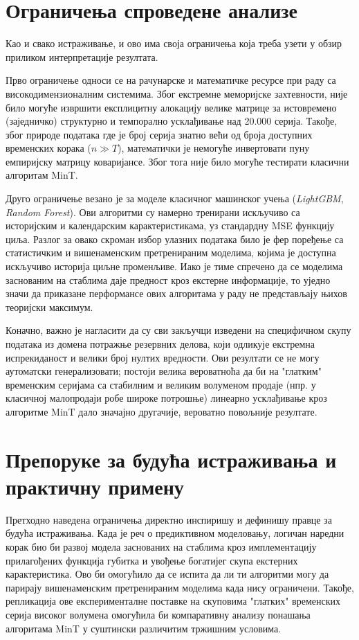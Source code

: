 \documentclass[12pt,oneside]{memoir}
\begin{document}
\section{Ограничења спроведене анализе}

Као и свако истраживање, и ово има своја ограничења која треба узети у обзир приликом интерпретације резултата.

Прво ограничење односи се на рачунарске и математичке ресурсе при раду са високодимензионалним системима. Због екстремне меморијске захтевности, није било могуће извршити експлицитну алокацију велике матрице за истовремено (заједничко) структурно и темпорално усклађивање над 20.000 серија. Такође, због природе података где је број серија знатно већи од броја доступних временских корака ($n \gg T$), математички је немогуће инвертовати пуну емпиријску матрицу коваријансе. Због тога није било могуће тестирати класични алгоритам MinT.

Друго ограничење везано је за моделе класичног машинског учења (\textit{LightGBM}, \textit{Random Forest}). Ови алгоритми су намерно тренирани искључиво са историјским и календарским карактеристикама, уз стандардну MSE функцију циља. Разлог за овако скроман избор улазних података било је фер поређење са статистичким и вишенаменским претренираним моделима, којима је доступна искључиво историја циљне променљиве. Иако је тиме спречено да се моделима заснованим на стаблима даје предност кроз екстерне информације, то уједно значи да приказане перформансе ових алгоритама у раду не представљају њихов теоријски максимум.

Коначно, важно је нагласити да су сви закључци изведени на специфичном скупу података из домена потражње резервних делова, који одликује екстремна испрекиданост и велики број нултих вредности. Ови резултати се не могу аутоматски генерализовати; постоји велика вероватноћа да би на "глатким" временским серијама са стабилним и великим волуменом продаје (нпр. у класичној малопродаји робе широке потрошње) линеарно усклађивање кроз алгоритме MinT дало значајно другачије, вероватно повољније резултате.


\section{Препоруке за будућа истраживања и практичну примену}

Претходно наведена ограничења директно инспиришу и дефинишу правце за будућа истраживања. Када је реч о предиктивном моделовању, логичан наредни корак био би развој модела заснованих на стаблима кроз имплементацију прилагођених функција губитка  и увођење богатијег скупа екстерних карактеристика. Ово би омогућило да се испита да ли ти алгоритми могу да парирају вишенаменским претренираним моделима када нису ограничени. Такође, репликација ове експерименталне поставке на скуповима "глатких" временских серија високог волумена омогућила би компаративну анализу понашања алгоритама MinT у суштински различитим тржишним условима.
\end{document}
